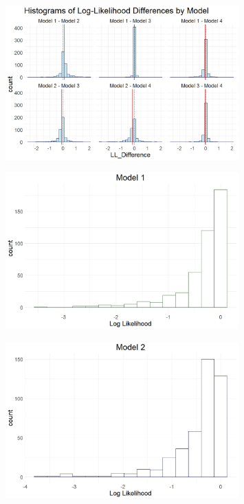 \documentclass[12pt]{article}
\begin{document}
\begin{figure}[h]
	\centering
	\includegraphics[width=0.8\textwidth]{model_comp_figures/LL_differences.jpeg}
	\caption{}
	\label{fig:ll_diff}
\end{figure}


\begin{figure}[h]
	\centering
	\includegraphics[width=0.8\textwidth]{model_comp_figures/LL_model1.jpeg}
	\caption{}
	\label{}
\end{figure}

\begin{figure}[h]
	\centering
	\includegraphics[width=0.8\textwidth]{model_comp_figures/LL_model2.jpeg}
	\caption{}
	\label{}
\end{figure}
\end{document}
